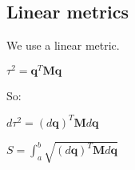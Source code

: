 
\subsection{Linear metrics}

We use a linear metric.

\(\tau^2 = \mathbf q^T\mathbf M\mathbf q\)

So:

\(d\tau^2 =(d\mathbf q)^T\mathbf Md\mathbf q \)

\(S = \int_a^b \sqrt {(d\mathbf q)^T\mathbf Md\mathbf q}\)

